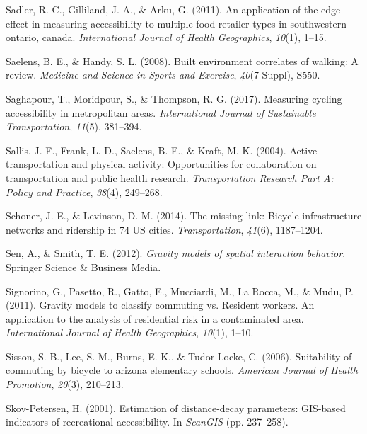 \documentclass[
11pt, %
oneside, %
english, %
singlespacing, %
]{macthesis} %
\newlength{\cslhangindent}
\newenvironment{CSLReferences}[2] %
 {%
  \setlength{\parindent}{0pt}
  \ifodd #1 \everypar{\setlength{\hangindent}{\cslhangindent}}\ignorespaces\fi
  \ifnum #2 > 0
  \setlength{\parskip}{#2\baselineskip}
  \fi
 }%
 {}
\begin{document}
\begin{CSLReferences}{1}{0}
\leavevmode{}%
Sadler, R. C., Gilliland, J. A., \& Arku, G. (2011). An application of the edge effect in measuring accessibility to multiple food retailer types in southwestern ontario, canada. \emph{International Journal of Health Geographics}, \emph{10}(1), 1--15.

\leavevmode{}%
Saelens, B. E., \& Handy, S. L. (2008). Built environment correlates of walking: A review. \emph{Medicine and Science in Sports and Exercise}, \emph{40}(7 Suppl), S550.

\leavevmode{}%
Saghapour, T., Moridpour, S., \& Thompson, R. G. (2017). Measuring cycling accessibility in metropolitan areas. \emph{International Journal of Sustainable Transportation}, \emph{11}(5), 381--394.

\leavevmode{}%
Sallis, J. F., Frank, L. D., Saelens, B. E., \& Kraft, M. K. (2004). Active transportation and physical activity: Opportunities for collaboration on transportation and public health research. \emph{Transportation Research Part A: Policy and Practice}, \emph{38}(4), 249--268.

\leavevmode{}%
Schoner, J. E., \& Levinson, D. M. (2014). The missing link: Bicycle infrastructure networks and ridership in 74 US cities. \emph{Transportation}, \emph{41}(6), 1187--1204.

\leavevmode{}%
Sen, A., \& Smith, T. E. (2012). \emph{Gravity models of spatial interaction behavior}. Springer Science \& Business Media.

\leavevmode{}%
Signorino, G., Pasetto, R., Gatto, E., Mucciardi, M., La Rocca, M., \& Mudu, P. (2011). Gravity models to classify commuting vs. Resident workers. An application to the analysis of residential risk in a contaminated area. \emph{International Journal of Health Geographics}, \emph{10}(1), 1--10.

\leavevmode{}%
Sisson, S. B., Lee, S. M., Burns, E. K., \& Tudor-Locke, C. (2006). Suitability of commuting by bicycle to arizona elementary schools. \emph{American Journal of Health Promotion}, \emph{20}(3), 210--213.

\leavevmode{}%
Skov-Petersen, H. (2001). Estimation of distance-decay parameters: GIS-based indicators of recreational accessibility. In \emph{ScanGIS} (pp. 237--258).


\end{CSLReferences}
\end{document}
